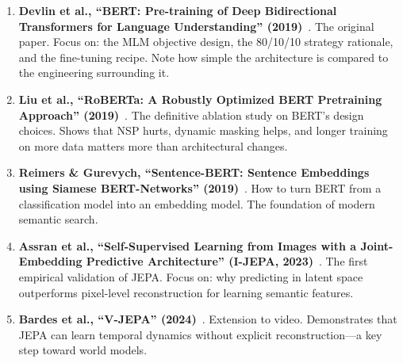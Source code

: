 \begin{enumerate}
  \item \textbf{Devlin et al., ``BERT: Pre-training of Deep Bidirectional Transformers for Language Understanding'' (2019)}~\cite{devlin2019bert}. The original paper. Focus on: the MLM objective design, the 80/10/10 strategy rationale, and the fine-tuning recipe. Note how simple the architecture is compared to the engineering surrounding it.

  \item \textbf{Liu et al., ``RoBERTa: A Robustly Optimized BERT Pretraining Approach'' (2019)}~\cite{liu2019roberta}. The definitive ablation study on BERT's design choices. Shows that NSP hurts, dynamic masking helps, and longer training on more data matters more than architectural changes.

  \item \textbf{Reimers \& Gurevych, ``Sentence-BERT: Sentence Embeddings using Siamese BERT-Networks'' (2019)}~\cite{reimers2019sentence}. How to turn BERT from a classification model into an embedding model. The foundation of modern semantic search.

  \item \textbf{Assran et al., ``Self-Supervised Learning from Images with a Joint-Embedding Predictive Architecture'' (I-JEPA, 2023)}~\cite{assran2023ijepa}. The first empirical validation of JEPA. Focus on: why predicting in latent space outperforms pixel-level reconstruction for learning semantic features.

  \item \textbf{Bardes et al., ``V-JEPA'' (2024)}~\cite{bardes2024vjepa}. Extension to video. Demonstrates that JEPA can learn temporal dynamics without explicit reconstruction---a key step toward world models.
\end{enumerate}
